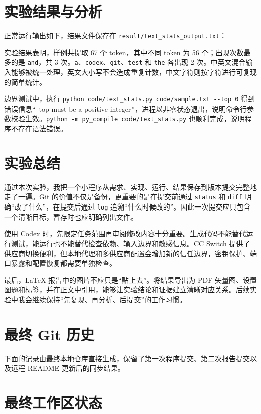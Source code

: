 \documentclass{SYSUReport}
\begin{document}
\section{实验结果与分析}

正常运行输出如下，结果文件保存在 \texttt{result/text\_stats\_output.txt}：



实验结果表明，样例共提取 67 个 token，其中不同 token 为 56 个；出现次数最多的是 \texttt{and}，共 3 次。\texttt{a}、\texttt{codex}、\texttt{git}、\texttt{test} 和 \texttt{the} 各出现 2 次。中英文混合输入能够被统一处理，英文大小写不会造成重复计数，中文字符则按字符进行可复现的简单统计。

边界测试中，执行 \verb|python code/text_stats.py code/sample.txt --top 0| 得到错误信息“--top must be a positive integer”，进程以非零状态退出，说明命令行参数校验生效。\verb|python -m py_compile code/text_stats.py| 也顺利完成，说明程序不存在语法错误。

\section{实验总结}

通过本次实验，我把一个小程序从需求、实现、运行、结果保存到版本提交完整地走了一遍。Git 的价值不仅是备份，更重要的是在提交前通过 \texttt{status} 和 \texttt{diff} 明确“改了什么”，在提交后通过 \texttt{log} 追溯“什么时候改的”。因此一次提交应只包含一个清晰目标，暂存时也应明确列出文件。

使用 Codex 时，先限定任务范围再审阅修改内容十分重要。生成代码不能替代运行测试，能运行也不能替代检查依赖、输入边界和敏感信息。CC Switch 提供了供应商切换便利，但本地代理和多供应商配置会增加新的信任边界，密钥保护、端口暴露和配置恢复都需要单独检查。

最后，LaTeX 报告中的图片不应只是“贴上去”。将结果导出为 PDF 矢量图、设置图题和标签，并在正文中引用，能够让实验结论和证据建立清晰对应关系。后续实验中我会继续保持“先复现、再分析、后提交”的工作习惯。

\appendix
\section{最终 Git 历史}

下面的记录由最终本地仓库直接生成，保留了第一次程序提交、第二次报告提交以及远程 README 更新后的同步结果。



\section{最终工作区状态}


\end{document}
